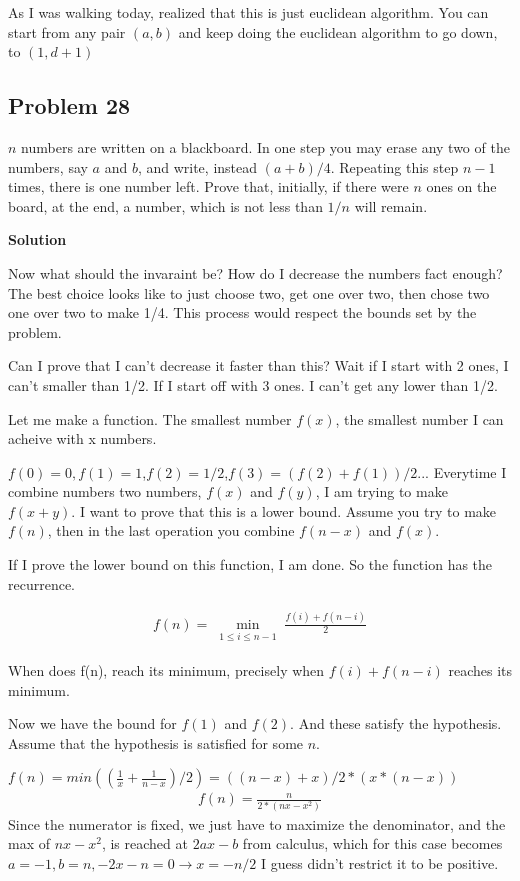\documentclass[12pt,tikz,border=10pt]{article}
\theoremstyle{definition}
\theoremstyle{remark}
\begin{document}
As I was walking today, realized that this is just euclidean algorithm. You can start from any pair
$(a,b)$ and keep doing the euclidean algorithm to go down, to $(1,d+1)$

\subsection{Problem 28}
$n$ numbers are written on a blackboard. In one step you may erase any two of the
numbers, say $a$ and $b$, and write, instead $(a + b)/4$. Repeating this step $n-1$ times,
there is one number left. Prove that, initially, if there were $n$ ones on the board, at
the end, a number, which is not less than $1/n$ will remain.

\textbf{Solution}

Now what should the invaraint be? How do I decrease the numbers fact enough? The best choice looks 
like to just choose two, get one over two, then chose two one over two to make 1/4.
This process would respect the bounds set by the problem.

Can I prove that I can't decrease it faster than this? Wait if I start with 2 ones, I can't 
smaller than 1/2. If I start off with 3 ones. I can't get any lower than 1/2. 

Let me make a function. The smallest number $f(x)$, the smallest number I can acheive with 
x numbers.

$f(0)=0,f(1)=1$,$f(2)=1/2$,$f(3)=(f(2)+f(1))/2$...
Everytime I combine numbers two numbers, $f(x)$ and $f(y)$, I am trying to make 
$f(x+y)$. I want to prove that this is a lower bound. Assume you try to make
$f(n)$, then in the last operation you combine $f(n-x)$ and $f(x)$. 

If I prove the lower bound on this function, I am done.
So the function has the recurrence.

\begin{align*}
    f(n) = \min_{\substack{1 \leq i \leq n-1}}{\frac{f(i)+f(n-i)}{2}}
\end{align*}

When does f(n), reach its minimum, precisely when $f(i)+f(n-i)$ reaches its minimum.

Now we have the bound for $f(1)$ and $f(2)$. And these satisfy the hypothesis.
Assume that the hypothesis is satisfied for some $n$.

$f(n)=min((\frac{1}{x}+\frac{1}{n-x})/2)=((n-x)+x)/2*(x*(n-x))$
\begin{align*}
   f(n)=\frac{n}{2*(nx-x^2)}
\end{align*}
Since the numerator is fixed, we just have to maximize the denominator, and
the max of $nx-x^2$, is reached at $2ax-b$ from calculus, which for this case becomes
$a=-1, b=n, -2x-n=0 \rightarrow x=-n/2$ I guess didn't restrict it to be positive.
\end{document}
